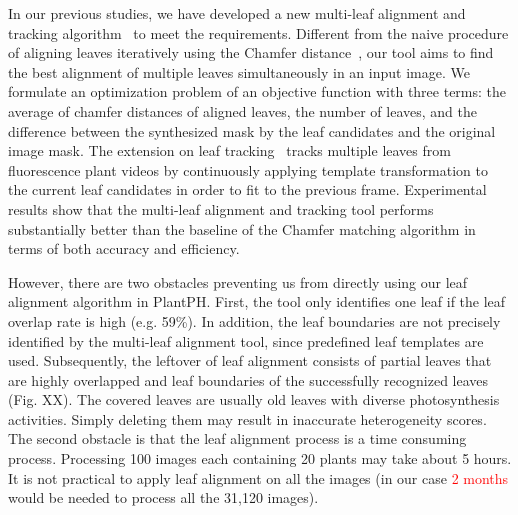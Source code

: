 \documentclass{bioinfo}
\begin{document}
In our previous studies, we have developed a new multi-leaf alignment and tracking algorithm~\citep{yin2014} to meet the requirements.  %
%
Different from the naive procedure of aligning leaves iteratively using the Chamfer distance~\citep{barrow1977parametric}, our tool aims to find the best alignment of multiple leaves simultaneously in an input image. We formulate an optimization problem of an objective function with three terms: the average of chamfer distances of aligned leaves, the number of leaves, and the difference between the synthesized mask by the leaf candidates and the original image mask.
%
The extension on leaf tracking~\citep{xi2014tracking} tracks multiple leaves from fluorescence plant videos by continuously applying template transformation to the current leaf candidates in order to fit to the previous frame.
%
Experimental results show that the multi-leaf alignment and tracking tool performs substantially better than the baseline of the Chamfer matching algorithm in terms of both accuracy and efficiency.






However, there are two obstacles preventing us from directly using our leaf alignment algorithm in PlantPH. First, the tool only identifies one leaf if the leaf overlap rate is high (e.g. 59\%).
%
In addition, the leaf boundaries are not precisely identified by the multi-leaf alignment tool, since predefined leaf templates are used.
%
Subsequently, the leftover of leaf alignment consists of partial leaves that are highly overlapped and leaf boundaries of the successfully recognized leaves (Fig. XX). The covered leaves are usually old leaves with diverse photosynthesis activities. Simply deleting them may result in inaccurate heterogeneity scores.
%
The second obstacle is that the leaf alignment process is a time consuming process. Processing 100 images each containing 20 plants may take about 5 hours. It is not practical to apply leaf alignment on all the images (in our case \textcolor{red}{2 months} %
would be needed to process all the 31,120 images).
\end{document}

